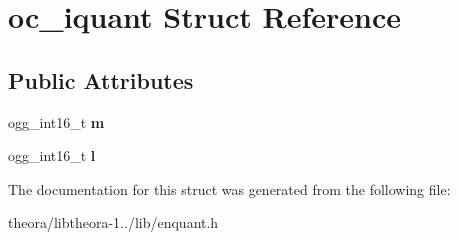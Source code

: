 \hypertarget{structoc__iquant}{\section{oc\+\_\+iquant Struct Reference}
\label{structoc__iquant}
}
\subsection*{Public Attributes}
\begin{DoxyCompactItemize}
\item 
\hypertarget{structoc__iquant_ad13121d667d7a51253ca8679e61ec8a2}{ogg\+\_\+int16\+\_\+t {\bfseries m}}\label{structoc__iquant_ad13121d667d7a51253ca8679e61ec8a2}

\item 
\hypertarget{structoc__iquant_a83d52eeaca74119f4af663fabd9e20f3}{ogg\+\_\+int16\+\_\+t {\bfseries l}}\label{structoc__iquant_a83d52eeaca74119f4af663fabd9e20f3}

\end{DoxyCompactItemize}


The documentation for this struct was generated from the following file\+:\begin{DoxyCompactItemize}
\item 
theora/libtheora-\/1../lib/enquant.\+h\end{DoxyCompactItemize}
